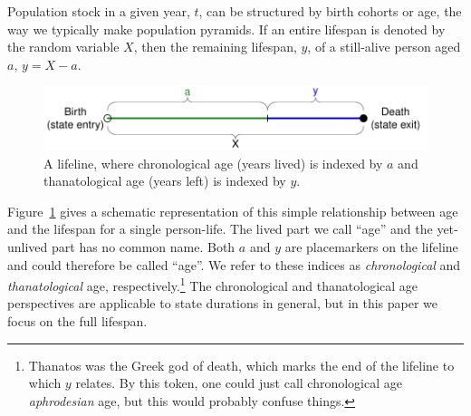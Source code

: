 \documentclass{article}
\begin{document}

Population stock in a
 given year, $t$, can be structured by birth cohorts or age, the way we typically make 
 population pyramids. If an entire lifespan is denoted by the random variable
 $X$, then the remaining lifespan, $y$, of a still-alive person aged $a$, $y = X - a$.
\begin{figure}[h]
\centering
	\caption{A lifeline, where chronological age (years lived) is indexed by $a$
	and thanatological age (years left) is indexed by $y$.}
	\label{fig:line}
	\includegraphics[scale=.8]{Figures/LifeLine.pdf}	
\end{figure}
Figure~\ref{fig:line} gives a schematic representation of this simple
relationship between age and the lifespan for a single person-life. The lived
part we call ``age'' and the yet-unlived part has no common name. Both $a$ and $y$ are placemarkers on the
lifeline and could therefore be called ``age''. We refer to these indices as
\textit{chronological} and \textit{thanatological} age, respectively.\footnote{Thanatos was the Greek god of death, which marks the end of the lifeline to which $y$ relates. By this token, one could just call chronological age \textit{aphrodesian} age, but this would probably confuse things.}
The chronological and thanatological age perspectives are applicable to state
durations in general, but in this paper we focus on the full lifespan.
\end{document}
